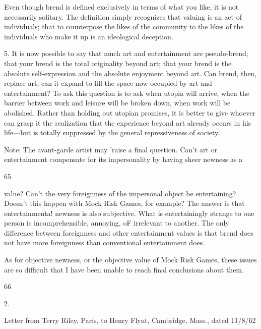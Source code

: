 \documentclass[10pt,twoside]{memoir}
\begin{document}
\begin{enumerate}
{{{{{{{{{{{{{{Even though brend is defined exclusively in terms of what you like, it is not 
necessarily solitary. The definition simply recognizes that valuing is an act of 
individuals; that to counterpose the likes of the community to the likes of 
the individuals who make it up is an ideological deception. 

5. It is now possible to say that much art and entertainment are 
pseudo-brend; that your brend is the total originality beyond art; that your 
brend is the absolute self-expression and the absolute enjoyment beyond art. 
Can brend, then, replace art, can it expand to fill the space now occupied by 
art and entertainment? To ask this question is to ask when utopia will 
arrive, when the barrier between work and leisure will be broken down, 
when work will be abolished. Rather than holding out utopian promises, it is 
better to give whoever can grasp it the realization that the experience 
beyond art already occurs in his life---but is totally suppressed by the general 
repressiveness of society. 


Note: The avant-garde artist may 'raise a final question. Can't art or 
entertainment compensate for its impersonality by having sheer newness as a 


65 


value? Can't the very foreignness of the impersonal object be entertaining? 
Doesn't this happen with Mock Risk Games, for example? The answer is 
that entertainmenta! newness is also subjective. What is entertainingly 
strange to one person is incomprehensible, annoying, oF irrelevant to 
another. The only difference between foreignness and other entertainment 
values is that brend does not have more foreignness than conventional 
entertainment does. 

As for objective newness, or the objective value of Mock Risk Games, these 
issues are so difficult that I have been unable to reach final conclusions 
about them. 


66 


2. 


Letter from Terry Riley, Paris, to Henry Flynt, Cambridge, 
Mass., dated 11/8/62 


}}}}}}}}}}}}}}
\end{enumerate}
\end{document}
